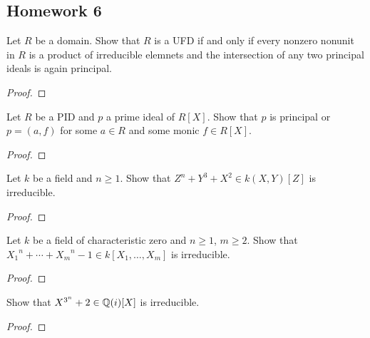 \subsection{Homework 6}
\begin{problem}
Let $R$ be a domain. Show that $R$ is a UFD if and only if every nonzero
nonunit in $R$ is a product of irreducible elemnets and the intersection of
any two principal ideals is again principal.
\end{problem}
\begin{proof}
\end{proof}

\begin{problem}
Let $R$ be a PID and $p$ a prime ideal of $R[X]$. Show that $p$ is
principal or $p=(a,f)$ for some $a\in R$ and some monic $f\in R[X]$.
\end{problem}
\begin{proof}
\end{proof}

\begin{problem}
Let $k$ be a field and $n\geq 1$. Show that $Z^n+Y^3+X^2\in k(X,Y)[Z]$ is
irreducible.
\end{problem}
\begin{proof}
\end{proof}

\begin{problem}
Let $k$ be a field of characteristic zero and $n\geq 1$, $m\geq 2$. Show
that ${X_1}^n+\dotsb+{X_m}^n-1\in k[X_1,\dotsc,X_m]$ is irreducible.
\end{problem}
\begin{proof}
\end{proof}

\begin{problem}
Show that $X^{3^n}+2\in\mathbb{Q}(i)[X]$ is irreducible.
\end{problem}
\begin{proof}
\end{proof}

